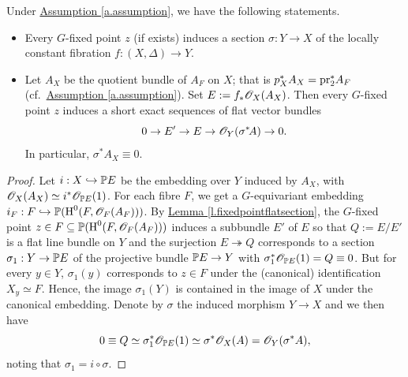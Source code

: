 \begin{lemme}
\label{lem_lcf-section}
Under {\hyperref[a.assumption]{Assumption \ref*{a.assumption}}}, we have the following statements. 
\begin{itemize}
\item[\rm(a)] Every $G$-fixed point $z$ (if exists) induces a section $\sigma:Y\to X$ of the locally constant fibration $f: (X,\Delta)\to Y$.
\item[\rm(b)] Let $A_X$ be the quotient bundle of $A_F$ on $X$; that is $p_X^*A_X=\textup{pr}_2^*A_F$ (cf.~{\hyperref[a.assumption]{Assumption \ref*{a.assumption}}}).
Set $E:=f_\ast\mathscr O_X(A_X)$. 
Then every $G$-fixed point $z$ induces a short exact sequences of flat vector bundles 
\[
0\to E'\to E\to \mathscr O_Y(\sigma^\ast\!A)\to 0.
\]
In particular, $\sigma^*A_X\equiv 0$. 
\end{itemize}
\end{lemme}
\begin{proof}
Let $i:X\hookrightarrow\mathbb P E$ be the embedding over $Y$ induced by $A_X$, with $\mathscr O_X(A_X)\simeq i^\ast\mathscr O_{\mathbb P E}(1)$. 
For each fibre $F$, we get a $G$-equivariant embedding $i_F: F\hookrightarrow\mathbb P(\operatorname{H}^0(F,\mathscr O_F(A_F)))$. 
By {\hyperref[l.fixedpointflatsection]{Lemma \ref*{l.fixedpointflatsection}}}, the $G$-fixed point $z\in F\subseteq\mathbb P(\operatorname{H}^0(F, \mathscr O_F(A_F)))$ induces a subbundle $E'$ of $E$ so that $Q:=E/E'$ is a flat line bundle on $Y$ and the surjection $E\twoheadrightarrow Q$ corresponds to a section $\sigma_1: Y\to\mathbb P E$ of the projective bundle $\mathbb P E\to Y$  with $\sigma_1^\ast\mathscr O_{\mathbb P E}(1)=Q\equiv 0$. 
But for every $y\in Y$, $\sigma_1(y)$ corresponds to $z\in F$ under the (canonical) identification $X_y\simeq F$. Hence, the image $\sigma_1(Y)$ is contained in the image of $X$ under the canonical embedding. 
Denote by $\sigma$ the induced morphism $Y\to X$  and we then have
\[
0\equiv Q\simeq\sigma_1^\ast\mathscr O_{\mathbb P E}(1)\simeq\sigma^\ast\mathscr O_X(A)=\mathscr O_Y(\sigma^\ast A),
\]
noting that $\sigma_1=i\circ\sigma$.
\end{proof}


